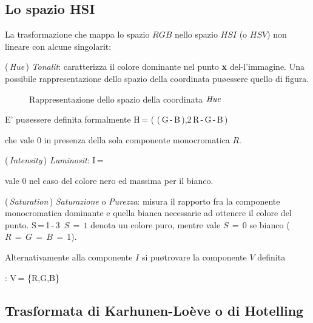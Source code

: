 \subsection{Lo spazio HSI}

La trasformazione che mappa lo spazio $RGB$ nello spazio $HSI$ (o $HSV$) \e non lineare con
alcune singolarit\a:
\bi

\im (\,{\it Hue}\,) {\it Tonalit\a}: caratterizza il colore dominante nel punto {\bf x} 
    del-l'immagine.
    Una possibile rappresentazione dello spazio della coordinata pu\o essere quello
    di figura. 

    \begin{figure}[h]
    \centerline{
     }
    \caption{Rappresentazione dello spazio della coordinata ${\it Hue}$}
    \end{figure}


    E' pu\o essere definita formalmente 
    \be
    H\,=\,\arctan\,(\,\,(\,G\,-\,B\,),2\,R\,-\,G\,-\,B\,)
    \ee
    
    che vale $0$ in presenza della sola componente monocromatica $R$.

\im (\,{\it Intensity}\,) {\it Luminosit\a}:
    \be
    I\,=\,
    \ee

    vale $0$ nel caso del colore nero ed \e massima per il bianco.

\im (\,{\it Saturation}\,) {\it Saturazione} o {\it Purezza}: misura il rapporto fra
    la componente monocromatica dominante e quella bianca necessarie ad ottenere
    il colore del punto.
    \be
    S\,=\,1\,-\,3\,
    \ee    
    $S\,=\,1$ denota un colore puro, mentre vale $S\,=\,0$ se bianco ($R\,=\,G\,=\,B\,=\,1$).

\ei

Alternativamente alla componente $I$ si pu\o trovare la componente $V$ definita

\bi

:
    \be
    V\,=\,\max\,\{R,G,B\}
    \ee
 
\ei

\subsection{Trasformata di Karhunen-Lo\`eve o di Hotelling}

